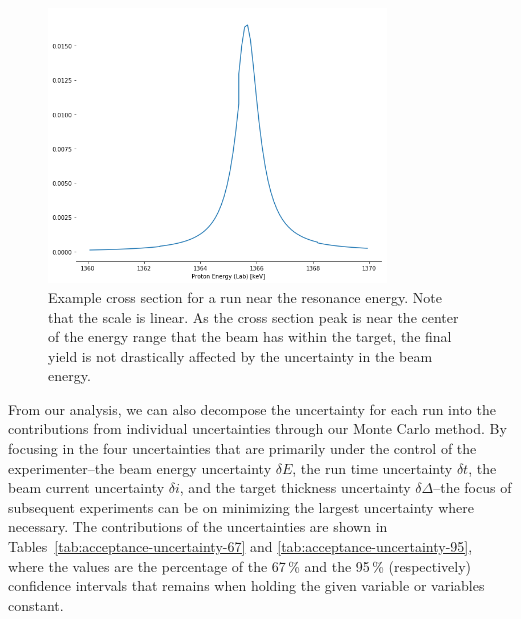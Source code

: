 \begin{figure}
    \begin{center}
        \label{fig:example-cross-section}
        \centerline{
            \includegraphics[width=0.8\textwidth]{figures/xs_example.png}}
        \caption[Example cross section]{Example cross section for a run
            near the resonance energy. Note that the scale is linear. As
            the cross section peak is near the center of the energy
            range that the beam has within the target, the final yield
            is not drastically affected by the uncertainty in the beam
            energy.}
    \end{center}
\end{figure}

From our analysis, we can also decompose the uncertainty for each run
into the contributions from individual uncertainties through our Monte
Carlo method. By focusing in the four uncertainties that are primarily
under the control of the experimenter\---{}the beam energy uncertainty
$\delta E$, the run time uncertainty $\delta t$, the beam current
uncertainty $\delta i$, and the target thickness uncertainty
$\delta\Delta$\---{}the focus of subsequent experiments can be on
minimizing the largest uncertainty where necessary. The contributions of
the uncertainties are shown in
Tables~\ref{tab:acceptance-uncertainty-67} and
\ref{tab:acceptance-uncertainty-95}, where the values are the percentage
of the 67\,\% and the 95\,\% (respectively) confidence intervals that
remains when holding the given variable or variables constant.

